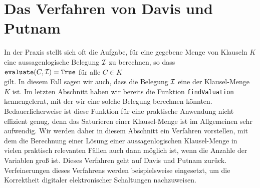 
\section{Das Verfahren von Davis und Putnam}
In der Praxis stellt sich oft die Aufgabe, für eine gegebene Menge von Klauseln $K$ eine aussagenlogische
Belegung $\mathcal{I}$ zu berechnen, so dass 
\\[0.2cm]
\hspace*{1.3cm} $\texttt{evaluate}(C,\mathcal{I}) = \texttt{True}$ \quad für alle $C\in K$ \\[0.2cm]
gilt.  In diesem Fall sagen wir auch, dass die Belegung $\mathcal{I}$ eine  der
Klausel-Menge $K$ ist.  Im letz\-ten Abschnitt haben wir bereits die Funktion \texttt{findValuation}
kennengelernt, mit der wir eine solche Belegung berechnen könnten.
Bedauerlicherweise ist diese Funktion für eine praktische Anwendung nicht effizient genug, denn das Saturieren
einer Klausel-Menge ist im Allgemeinen sehr aufwendig.
Wir werden daher in diesem Abschnitt ein Verfahren vorstellen, mit dem die Berechnung einer Lösung
einer aussagenlogischen Klausel-Menge in vielen praktisch relevanten Fällen auch dann möglich ist, wenn die
Anzahle der Variablen groß ist.  Dieses Verfahren geht auf Davis und Putnam
\cite{davis:1960, davis:1962} zurück.  Verfeinerungen dieses Verfahrens \cite{moskewicz:2001} werden beispielsweise
eingesetzt, um die Korrektheit digitaler elektronischer Schaltungen nachzuweisen.  

